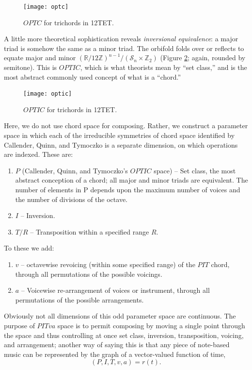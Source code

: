 \documentclass[english,11pt,letterpaper,onecolumn]{scrartcl}
\numberwithin{equation}{section}
\begin{document}
    \begin{figure}
        \centerline{\texttt{[image: optc]}}
        \caption{\label{fig:optc} 
           $OPTC$ for trichords in 12TET.}
    \end{figure}

A little more theoretical sophistication reveals \textit{inversional 
equivalence}: a major triad is somehow the same as a minor triad. The 
orbifold folds over or reflects to equate major and minor 
$\left(\mathbb{R}/12\mathbb{Z}\right)^{n-1}/(\mathcal{S}_{n} \times 
\mathbb{Z}_{2})$ (Figure \ref{fig:optic}; again, rounded by semitone). This is 
$OPTIC$, which is what theorists mean by ``set class,'' and is the most 
abstract commonly used concept of what is a ``chord.''

    \begin{figure}
        \centerline{\texttt{[image: optic]}}
        \caption{\label{fig:optic} 
           $OPTIC$ for trichords in 12TET.}
    \end{figure}

Here, we do not use chord space for composing. Rather, we construct a parameter 
space in which each of the irreducible symmetries of chord space identified by 
Callender, Quinn, and Tymoczko is a separate dimension, on which operations are 
indexed. These are:

\begin{enumerate}
 \item $P$ (Callender, Quinn, and Tymoczko's $OPTIC$ space) -- Set class, the 
most abstract conception of a chord; all major and minor triads are equivalent. 
The number of elements in P depends upon the maximum number of voices and the 
number of divisions of the octave.
 \item $I$ -- Inversion.
 \item $T/R$ -- Transposition within a specified range $R$.
\end{enumerate}

\noindent To these we add:

\begin{enumerate}[resume]
 \item $v$ -- octavewise revoicing (within some specified range) of the 
$PIT$ chord, through all permutations of the possible voicings.
 \item $a$ -- Voicewise re-arrangement of voices or instrument, through all
permutations of the possible arrangements.
\end{enumerate}

\noindent Obviously not all dimensions of this odd parameter space are 
continuous. The purpose of $PITva$ space is to permit composing by moving a 
single point through the space and thus controlling at once set class, 
inversion, transposition, voicing, and arrangement; another way of saying this 
is that any piece of note-based music can be represented by the graph of a 
vector-valued function of time, $$(P, I, T, v, a) = r(t).$$
\end{document}
